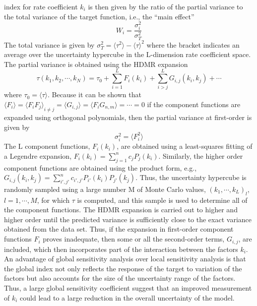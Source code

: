 index for rate coefficient $k_i$ is then given by the ratio of the
partial variance to the total variance of the target function, i.e.,
the “main effect”
\begin{equation}
\label{ch3:eqn14}
W_i = \frac{\sigma_i^{2}}{\sigma_T^2}
\end{equation}
The total variance is given by $\sigma_T^2=\langle {\tau}^2 \rangle - {\langle \tau \rangle}^2$ where the
bracket indicates an average over the uncertainty hypercube in
the L-dimension rate coefficient space. The partial variance is
obtained using the HDMR expansion
\begin{equation}
\label{ch3:eqn15:HDMR}
\tau(k_1, k_2,\cdots,k_N) = \tau_0 + \sum_{i=1}^{L}{F_i(k_i)} + \sum_{i>j}^{L} {G_{i,j}(k_i, k_j)} + \cdots
\end{equation}
where $\tau_0 = \langle \tau \rangle$. Because it can be shown that $\langle F_i \rangle = {\langle F_iF_j \rangle}_{i \neq j} = \langle G_{i,j} \rangle = \langle F_iG_{n,m}  \rangle = \cdots = 0$ if the component functions are
expanded using orthogonal polynomials, then the partial
variance at first-order is given by
\begin{equation}
\label{ch3:eqn16:sigmaF}
\sigma_i^2 = \langle F_i^2 \rangle
\end{equation}
The L component functions, $F_i(k_i)$, are obtained using a
least-squares fitting of a Legendre expansion, $F_i(k_i) = \sum_{j=1}^{n}{c_jP_j(k_i)}$. Similarly, the higher order component functions
are obtained using the product form, e.g., $G_{i,j}(k_i,k_j) = \sum_{i\prime,j\prime}^{n}{c_{i\prime,j\prime}P_{i\prime}(k_i)P_{j\prime}(k_j)}$. Thus, the uncertainty hypercube is
randomly sampled using a large number M of Monte Carlo
values, ${(k_1, \cdots, k_L)}_l$, $l = 1, \cdots, M$, for which $\tau$ is computed, and this
sample is used to determine all of the component functions.
The HDMR expansion is carried out to higher and higher order
until the predicted variance is sufficiently close to the exact
variance obtained from the data set. Thus, if the expansion in
first-order component functions $F_i$ proves inadequate, then
some or all the second-order terms, $G_{i,j}$, are included, which
then incorporates part of the interaction between the factors $k_i$.
An advantage of global sensitivity analysis over local sensitivity
analysis is that the global index not only reflects the response of
the target to variation of the factors but also accounts for the
size of the uncertainty range of the factors. Thus, a large global
sensitivity coefficient suggest that an improved measurement of
$k_i$ could lead to a large reduction in the overall uncertainty of
the model.
\newline
